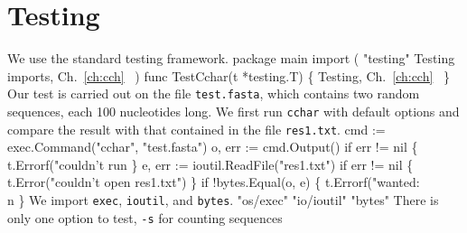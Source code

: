 \section*{Testing}
We use the standard testing framework.
\nwenddocs{}\endmoddef\nwstartdeflinemarkup\nwenddeflinemarkup
package main
import (
          "testing"
          \LA{}Testing imports, Ch.~\ref{ch:cch}~{\nwtagstyle{}}\RA{}
)
func TestCchar(t *testing.T) \{
          \LA{}Testing, Ch.~\ref{ch:cch}~{\nwtagstyle{}}\RA{}
\}
\nwendcode{}\nwdocspar
Our test is carried out on the file \texttt{test.fasta}, which
contains two random sequences, each 100 nucleotides long. We first run
\texttt{cchar} with default options and compare the result with that
contained in the file \texttt{res1.txt}.
\nwenddocs{}\endmoddef\nwstartdeflinemarkup{}\nwenddeflinemarkup
cmd := exec.Command("cchar", "test.fasta")
o, err := cmd.Output()
if err != nil \{
          t.Errorf("couldn't run %
\}
e, err := ioutil.ReadFile("res1.txt")
if err != nil \{
          t.Error("couldn't open res1.txt")
\}
if !bytes.Equal(o, e) \{
          t.Errorf("wanted:\\n%
\}
\nwendcode{}\nwdocspar
We import \texttt{exec}, \texttt{ioutil}, and \texttt{bytes}.
\nwenddocs{}\endmoddef\nwstartdeflinemarkup{}\nwenddeflinemarkup
"os/exec"
"io/ioutil"
"bytes"
\nwendcode{}\nwdocspar
There is only one option to test, \texttt{-s} for counting sequences
